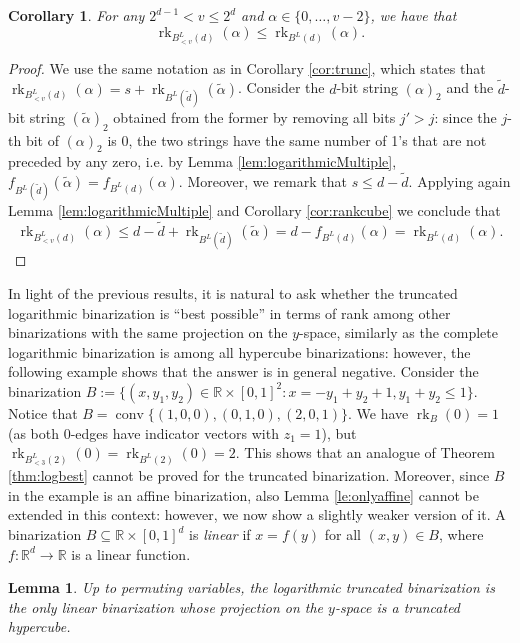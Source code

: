 \documentclass[11pt,a4paper]{article}
\newtheorem{lemma}[theorem]{Lemma}
\newtheorem{corollary}[theorem]{Corollary}
\newcommand{\R}{\mathbb{R}}
\newcommand{\conv}{\operatorname{conv}}
\newcommand{\1}{\textbf{1}}
\newcommand{\rk}{\operatorname{rk}}
\begin{document}
\begin{corollary}\label{cor:trunc2}
For any $2^{d-1}< v\leq 2^d$ and $\alpha\in \{0,\dots,v-2\}$, we have that \[\rk_{B^L_{< v}(d)}(\alpha)\leq \rk_{B^L(d)}(\alpha).\]
\end{corollary}
\begin{proof}
We use the same notation as in Corollary \ref{cor:trunc}, which states that $\rk_{B^L_{< v}(d)}(\alpha) = s+\rk_{B^L(\tilde{d})}(\tilde{\alpha})$. Consider the $d$-bit string $(\alpha)_2$ and the $\tilde{d}$-bit string $(\tilde \alpha)_2$ obtained from the former by removing all bits $j'>j$: since the $j$-th bit of $(\alpha)_2$ is 0, the two strings have the same number of 1's that are not preceded by any zero, i.e. by Lemma \ref{lem:logarithmicMultiple}, $f_{B^L(\tilde{d})}(\tilde{\alpha})=f_{B^L(d)}(\alpha)$. Moreover, we remark that $s\leq d-\tilde{d}$. Applying again Lemma \ref{lem:logarithmicMultiple} and Corollary \ref{cor:rankcube} we conclude that 
 \[\rk_{B^L_{< v}(d)}(\alpha)\leq d-\tilde{d}+ \rk_{B^L(\tilde{d})}(\tilde{\alpha})%
 =d-f_{B^L(d)}(\alpha)=\rk_{B^L(d)}(\alpha).
 \]
\end{proof}

In light of the previous results, it is natural to ask whether the truncated logarithmic binarization is ``best possible'' in terms of rank among other binarizations with the same projection on the $y$-space, similarly as the complete logarithmic binarization is among all hypercube binarizations: however, the following example shows that the answer is in general negative. 
Consider the binarization $B:=\{(x,y_1,y_2)\in \R\times [0,1]^2: x=-y_1+y_2+1, y_1+y_2\leq 1\}$. Notice that $B=\conv\{(1,0,0),(0,1,0),(2,0,1)\}$. We have $\rk_B(0)=1$ (as both $0$-edges have indicator vectors with $z_1=1$), but $\rk_{B^L_{<3}(2)}(0)=\rk_{B^L(2)}(0)=2$.
This shows that an analogue of Theorem \ref{thm:logbest} cannot be proved for the truncated binarization. Moreover, since $B$ in the example is an affine binarization, also Lemma \ref{le:onlyaffine} cannot be extended in this context: however, we now show a slightly weaker version of it.
A binarization $B\subseteq\R\times[0,1]^d$ is \emph{linear} if $x=f(y)$ for all $(x,y)\in B$, where $f: \R^d\rightarrow \R$ is a linear function.

\begin{lemma}\label{lem:onlylinear}
Up to permuting variables, the logarithmic truncated binarization is the only linear binarization whose projection on the $y$-space is a truncated hypercube.
\end{lemma}
\end{document}
